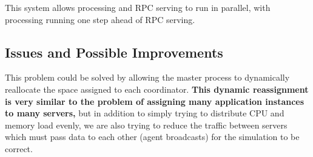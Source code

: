 This system allows processing and RPC serving to run in parallel, with processing running one step ahead of RPC serving.

\subsection{Issues and Possible Improvements}

This problem could be solved by allowing the master process to dynamically reallocate the space
assigned to each coordinator. \textbf{This dynamic reassignment is very similar to the problem of
assigning many application instances to many servers,} but in addition to simply trying to
distribute CPU and memory load evenly, we are also trying to reduce the traffic between servers
which must pass data to each other (agent broadcasts) for the simulation to be correct.
